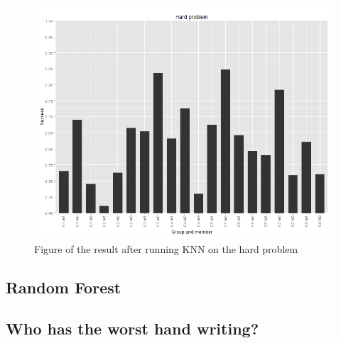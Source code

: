 \documentclass[report]{subfiles}
\begin{document}
\begin{figure}[H]
	\centering
	\includegraphics[width=1\textwidth]{images/knnHardProblem}
	\caption{Figure of the result after running KNN on the hard problem}
	\label{fig:knnHardProblem}
\end{figure}

\subsection{Random Forest}
\label{sec:resultRandomForest}

\subsection{Who has the worst hand writing?}
\end{document}
